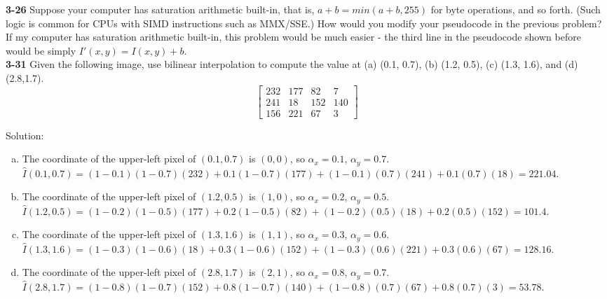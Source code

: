 \documentclass[a4paper]{article}
\begin{document}
\begin{spacing}{2.0}
	\newpage	
	\noindent
	
	\textbf{3-26} Suppose your computer has saturation arithmetic built-in, that is, $a+b = min(a+b, 255)$ for byte operations, and so forth. (Such logic is common for CPUs with SIMD instructions such as MMX/SSE.) How would you modify your pseudocode in the previous problem?\\
	
	If my computer has saturation arithmetic built-in, this problem would be much easier - the third line in the pseudocode shown before would be simply $I'(x, y) = I(x,y) + b$.\\
	
	\noindent
	\textbf{3-31} Given the following image, use bilinear interpolation to compute the value at (a) (0.1, 0.7), (b) (1.2, 0.5), (c) (1.3, 1.6), and (d) (2.8,1.7).
	$$\begin{bmatrix} 232 & 177 & 82 & 7 \\ 241 & 18 & 152 & 140 \\ 156 & 221 & 67 & 3\end{bmatrix}$$
	
	Solution:
	\begin{enumerate}[(a)]
	\item The coordinate of the upper-left pixel of $(0.1, 0.7)$ is $(0, 0)$, so $\alpha_{x} = 0.1$, $\alpha_{y} = 0.7$.\\
		$\hat I (0.1, 0.7) = (1-0.1)(1-0.7)(232) + 0.1(1-0.7)(177) + (1-0.1)(0.7)(241) + 0.1(0.7)(18) = \mathbf{221.04}$.
	\item The coordinate of the upper-left pixel of $(1.2, 0.5)$ is $(1, 0)$, so $\alpha_{x} = 0.2$, $\alpha_{y} = 0.5$.\\
		$\hat I (1.2, 0.5) = (1-0.2)(1-0.5)(177) + 0.2(1-0.5)(82) + (1-0.2)(0.5)(18) + 0.2(0.5)(152) = \mathbf{101.4}$.
	\item The coordinate of the upper-left pixel of $(1.3, 1.6)$ is $(1, 1)$, so $\alpha_{x} = 0.3$, $\alpha_{y} = 0.6$.\\
		$\hat I (1.3, 1.6) = (1-0.3)(1-0.6)(18) + 0.3(1-0.6)(152) + (1-0.3)(0.6)(221) + 0.3(0.6)(67) = \mathbf{128.16}$.
	\item The coordinate of the upper-left pixel of $(2.8, 1.7)$ is $(2, 1)$, so $\alpha_{x} = 0.8$, $\alpha_{y} = 0.7$.\\
		$\hat I (2.8, 1.7) = (1-0.8)(1-0.7)(152) + 0.8(1-0.7)(140) + (1-0.8)(0.7)(67) + 0.8(0.7)(3) = \mathbf{53.78}$.\\
	\end{enumerate}
	

\end{spacing}
\end{document}
